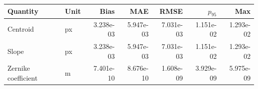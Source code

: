 \begin{tabular}{llrrrrr}
\hline
Quantity & Unit & Bias & MAE & RMSE & $p_{95}$ & Max \\
\hline
Centroid & px & 3.238e-03 & 5.947e-03 & 7.031e-03 & 1.151e-02 & 1.293e-02 \\
Slope & px & 3.238e-03 & 5.947e-03 & 7.031e-03 & 1.151e-02 & 1.293e-02 \\
Zernike coefficient & m & 7.401e-10 & 8.676e-10 & 1.608e-09 & 3.929e-09 & 5.975e-09 \\
\hline
\end{tabular}
